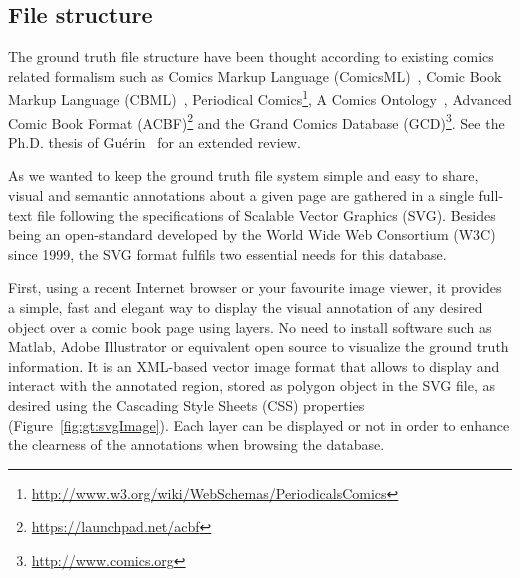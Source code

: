 

\subsection{File structure} %
\label{sub:file_structure}

The ground truth file structure have been thought according to existing comics related formalism such as Comics Markup Language (ComicsML)~\cite{McIntosh2011}, Comic Book Markup Language (CBML)~\cite{Walsh2012a}, Periodical Comics\footnote{\url{http://www.w3.org/wiki/WebSchemas/PeriodicalsComics}}, A Comics Ontology~\cite{Rissen2012}, Advanced Comic Book Format (ACBF)\footnote{\url{https://launchpad.net/acbf}} and the Grand Comics Database (GCD)\footnote{\url{http://www.comics.org}}.
See the Ph.D. thesis of Gu{\'e}rin~\cite{phdthesisGuerin14} for an extended review.

As we wanted to keep the ground truth file system simple and easy to share, visual and semantic annotations about a given page are gathered in a single full-text file following the specifications of Scalable Vector Graphics (SVG). 
Besides being an open-standard developed by the World Wide Web Consortium (W3C) since 1999, the SVG format fulfils two essential needs for this database.

First, using a recent Internet browser or your favourite image viewer, it provides a simple, fast and elegant way to display the visual annotation of any desired object over a comic book page using layers.
No need to install software such as Matlab, Adobe Illustrator or equivalent open source to visualize the ground truth information.
It is an XML-based vector image format that allows to display and interact with the annotated region, stored as polygon object in the SVG file, as desired using the Cascading Style Sheets (CSS) properties (Figure~\ref{fig:gt:svgImage}). 
Each layer can be displayed or not in order to enhance the clearness of the annotations when browsing the database.

